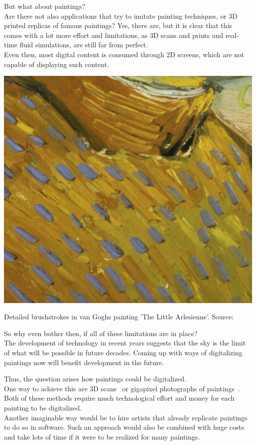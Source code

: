 But what about paintings?\\
Are there not also applications that try to imitate painting techniques, or 3D printed replicas of famous paintings?
Yes, there are, but it is clear that this comes with a lot more effort and limitations, as 3D scans and prints and real-time fluid simulations, are still far from perfect.\\
Even then, most digital content is consumed through 2D screens, which are not capable of displaying such content.
\begin{marginfigure}
    \includegraphics{images/cutout_orig}%
    \caption{Detailed brushstrokes in van Goghs painting 'The Little Arlesienne'. Source:~\cite{rhythmic}}
\end{marginfigure}

So why even bother then, if all of these limitations are in place?\\
The development of technology in recent years suggests that the sky is the limit of what will be possible in future decades.
Coming up with ways of digitalizing paintings now will benefit development in the future.

Thus, the question arises how paintings could be digitalized.\\
One way to achieve this are 3D scans~\cite{3Dscan_art, 3Dscan_thesis} or gigapixel photographs of paintings~\cite{googleartproject}.
Both of these methods require much technological effort and money for each painting to be digitalized.\\
Another imaginable way would be to hire artists that already replicate paintings to do so in software.
Such an approach would also be combined with huge costs and take lots of time if it were to be realized for many paintings.

